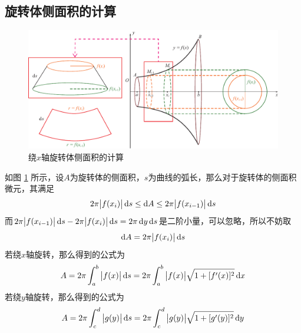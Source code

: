 \subsection{旋转体侧面积的计算}
\begin{figure}[!htb]
	\centering
	\includegraphics[width=0.8\linewidth]{pic/C-4/x旋转侧面积}
	\vspace*{-1em}
	\caption{绕$x$轴旋转体侧面积的计算}
	\label{x旋转侧}
\end{figure}
\par 如图 \ref{x旋转侧} 所示，设$A$为旋转体的侧面积，$s$为曲线的弧长，那么对于旋转体的侧面积微元，其满足
\begin{equation}
	2\pi \big|f(x_{i})\big| \, {\rm{d}} s \le {\rm{d}} A \le 2\pi \big|f(x_{i-1})\big| \, {\rm{d}} s
\end{equation}
而$2\pi \big|f(x_{i-1})\big|\, {\rm{d}} s - 2\pi \big|f(x_{i})\big|\, {\rm{d}} s = 2 \pi \, {\rm{d}} y \, {\rm{d}} s$是二阶小量，可以忽略，所以不妨取
\begin{equation}
	{\rm{d}} A = 2\pi \big| f(x_{i}) \big| \, {\rm{d}} s
\end{equation}
若绕$x$轴旋转，那么得到的公式为
\begin{equation}
	 A=2\pi \int_{a}^{b} \big|f(x)\big|\,{\rm{d}} s=2\pi\int_{a}^{b} \big|f(x)\big|\sqrt{1+[f'(x)]^2}\,{\rm{d}} x
\end{equation}
若绕$y$轴旋转，那么得到的公式为
\begin{equation}
	A=2\pi \int_{c}^{d} \big|g(y)\big|\,{\rm{d}} s=2\pi\int_{c}^{d}\big|g(y)\big|\sqrt{1+[g'(y)]^2}\,{\rm{d}} y
\end{equation}

